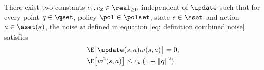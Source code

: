 \begin{lemma}
\label{eq: properties of noise}
    There exist two constants $c_1, c_2 \in \real_{\geq 0}$ independent of $\update$
    such that
    for every point $q \in \qset$, policy $\pol \in \polset$, state $s \in \sset$ and action $a \in \aset(s)$,
    the noise $w$ defined in equation \eqref{eq: definition combined noise} satisfies
    \begin{align}
        \label{eq: noise prop exp}
        &\E\big[ \update(s,a) w(s,a) \big] = 0 ,
        \\
        \label{eq: noise prop var}
        &\E\big[ w^2(s,a) \big] \leq c_w(1 + \| q \|^2) .
\end{align}
\end{lemma}

